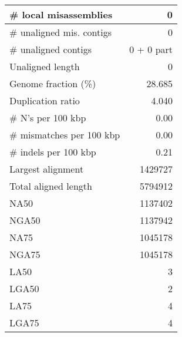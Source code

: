 \documentclass[12pt,a4paper]{article}
\begin{document}
\begin{table}[ht]
\begin{center}
\begin{tabular}{|l*{1}{|r}|}
\# local misassemblies & 0 \\ \hline
\# unaligned mis. contigs & 0 \\ \hline
\# unaligned contigs & 0 + 0 part \\ \hline
Unaligned length & 0 \\ \hline
Genome fraction (\%) & 28.685 \\ \hline
Duplication ratio & 4.040 \\ \hline
\# N's per 100 kbp & 0.00 \\ \hline
\# mismatches per 100 kbp & 0.00 \\ \hline
\# indels per 100 kbp & 0.21 \\ \hline
Largest alignment & 1429727 \\ \hline
Total aligned length & 5794912 \\ \hline
NA50 & 1137402 \\ \hline
NGA50 & 1137942 \\ \hline
NA75 & 1045178 \\ \hline
NGA75 & 1045178 \\ \hline
LA50 & 3 \\ \hline
LGA50 & 2 \\ \hline
LA75 & 4 \\ \hline
LGA75 & 4 \\ \hline
\end{tabular}
\end{center}
\end{table}
\end{document}
